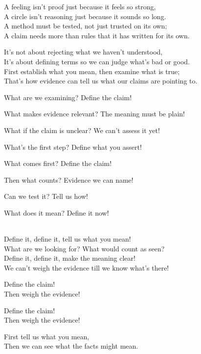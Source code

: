 \begin{lyrics}

A feeling isn't proof just because it feels so strong,\\
A circle isn't reasoning just because it sounds so long.\\
A method must be tested, not just trusted on its own;\\
A claim needs more than rules that it has written for its own.

It's not about rejecting what we haven't understood,\\
It's about defining terms so we can judge what's bad or good.\\
First establish what you mean, then examine what is true;\\
That's how evidence can tell us what our claims are pointing to.


 What are we examining?
 Define the claim!

 What makes evidence relevant?
 The meaning must be plain!

 What if the claim is unclear?
 We can't assess it yet!

 What's the first step?
 Define what you assert!


 What comes first?
 Define the claim!

 Then what counts?
 Evidence we can name!

 Can we test it?
 Tell us how!

 What does it mean?
 Define it now!

\\
Define it, define it, tell us what you mean!\\
What are we looking for? What would count as seen?\\
Define it, define it, make the meaning clear!\\
We can't weigh the evidence till we know what's there!


Define the claim!\\
Then weigh the evidence!

Define the claim!\\
Then weigh the evidence!

First tell us what you mean,\\
Then we can see what the facts might mean.
\end{lyrics}

